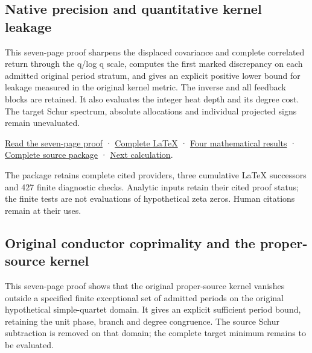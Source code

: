 \documentclass[
]{article}
\begin{document}
\subsection{Native precision and quantitative kernel
leakage}\label{native-precision-and-quantitative-kernel-leakage}

This seven-page proof sharpens the displaced covariance and complete
correlated return through the q/log q scale, computes the first marked
discrepancy on each admitted original period stratum, and gives an
explicit positive lower bound for leakage measured in the original
kernel metric. The inverse and all feedback blocks are retained. It also
evaluates the integer heat depth and its degree cost. The target Schur
spectrum, absolute allocations and individual projected signs remain
unevaluated.

\href{https://github.com/KokunoYumeto/zeta-function-research-reader/blob/main/workbenches/splitzero-tandem/continuations/20260919-native-precision-leakage/NATIVE_PRECISION_AND_LEAKAGE.pdf}{Read
the seven-page proof} ·
\href{https://github.com/KokunoYumeto/zeta-function-research-reader/blob/main/workbenches/splitzero-tandem/continuations/20260919-native-precision-leakage/NATIVE_PRECISION_AND_LEAKAGE.tex}{Complete
LaTeX} ·
\href{https://github.com/KokunoYumeto/zeta-function-research-reader/blob/main/workbenches/splitzero-tandem/continuations/20260919-native-precision-leakage/NEW_RESULTS_2026-09-19.md}{Four
mathematical results} ·
\href{https://github.com/KokunoYumeto/zeta-function-research-reader/blob/main/workbenches/splitzero-tandem/continuations/20260919-native-precision-leakage/README.md}{Complete
source package} ·
\href{https://github.com/KokunoYumeto/zeta-function-research-reader/blob/main/workbenches/splitzero-tandem/continuations/20260919-native-precision-leakage/CONTINUATION.md}{Next
calculation}.

The package retains complete cited providers, three cumulative LaTeX
successors and 427 finite diagnostic checks. Analytic inputs retain
their cited proof status; the finite tests are not evaluations of
hypothetical zeta zeros. Human citations remain at their uses.

\subsection{Original conductor coprimality and the proper-source
kernel}\label{original-conductor-coprimality-and-the-proper-source-kernel}

This seven-page proof shows that the original proper-source kernel
vanishes outside a specified finite exceptional set of admitted periods
on the original hypothetical simple-quartet domain. It gives an explicit
sufficient period bound, retaining the unit phase, branch and degree
congruence. The source Schur subtraction is removed on that domain; the
complete target minimum remains to be evaluated.
\end{document}
